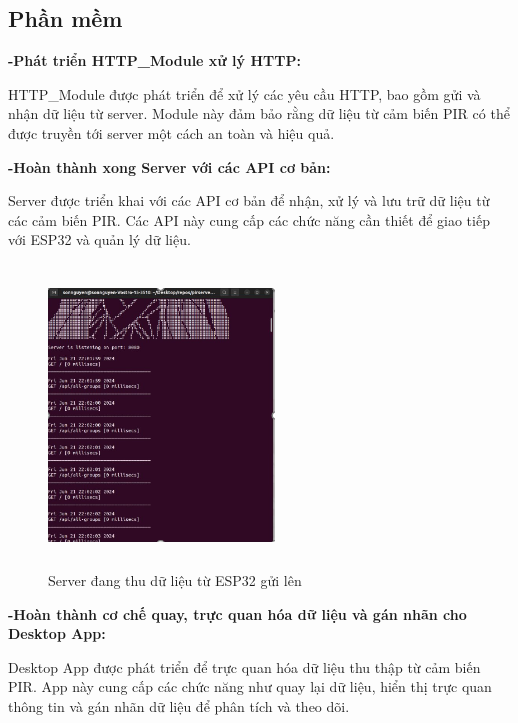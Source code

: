 \documentclass{article}
\begin{document}
\subsection{Phần mềm}
\textbf{-Phát triển HTTP\_Module xử lý HTTP:}

HTTP\_Module được phát triển để xử lý các yêu cầu HTTP, bao gồm gửi và nhận dữ liệu từ server. Module này đảm bảo rằng dữ liệu từ cảm biến PIR có thể được truyền tới server một cách an toàn và hiệu quả.

\textbf{-Hoàn thành xong Server với các API cơ bản:}

Server được triển khai với các API cơ bản để nhận, xử lý và lưu trữ dữ liệu từ các cảm biến PIR. Các API này cung cấp các chức năng cần thiết để giao tiếp với ESP32 và quản lý dữ liệu.
\begin{figure}[H]
    \centering
    \includegraphics[width=6cm,height=8cm]{image/anh13.png}
    \caption{Server đang thu dữ liệu từ ESP32 gửi lên} \label{EV}
\end{figure}
\textbf{-Hoàn thành cơ chế quay, trực quan hóa dữ liệu và gán nhãn cho Desktop App:}


Desktop App được phát triển để trực quan hóa dữ liệu thu thập từ cảm biến PIR. App này cung cấp các chức năng như quay lại dữ liệu, hiển thị trực quan thông tin và gán nhãn dữ liệu để phân tích và theo dõi.
\end{document}
